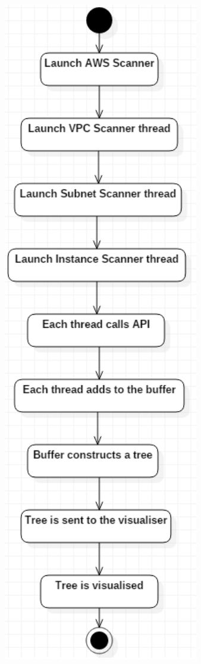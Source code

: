\documentclass[a4paper,12pt]{report}
\begin{document}
\begin{itemize}
\begin{center}
  	  	\includegraphics[width=1\textwidth] {./Diagrams/ScanNetworkSequence.png}\\[0.4cm]    

\end{center}
\end{itemize}
\end{document}
